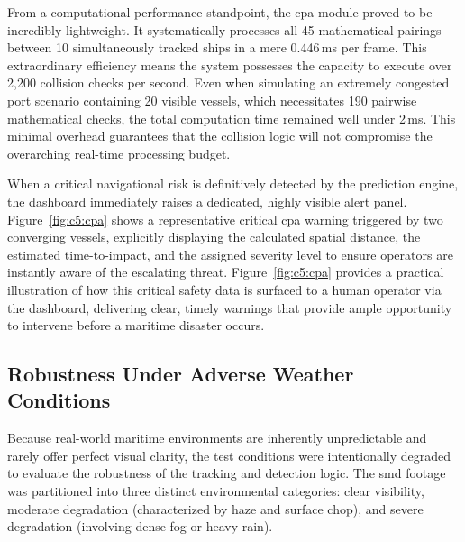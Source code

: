 From a computational performance standpoint, the \gls{cpa} module proved to be incredibly lightweight. It systematically processes all 45 mathematical pairings between 10 simultaneously tracked ships in a mere 0.446\,ms per frame. This extraordinary efficiency means the system possesses the capacity to execute over 2,200 collision checks per second. Even when simulating an extremely congested port scenario containing 20 visible vessels, which necessitates 190 pairwise mathematical checks, the total computation time remained well under 2\,ms. This minimal overhead guarantees that the collision logic will not compromise the overarching real-time processing budget.
\begin{reportfigblock}
When a critical navigational risk is definitively detected by the prediction engine, the dashboard immediately raises a dedicated, highly visible alert panel. Figure~\ref{fig:c5:cpa} shows a representative critical \gls{cpa} warning triggered by two converging vessels, explicitly displaying the calculated spatial distance, the estimated time-to-impact, and the assigned severity level to ensure operators are instantly aware of the escalating threat.
Figure~\ref{fig:c5:cpa} provides a practical illustration of how this critical safety data is surfaced to a human operator via the dashboard, delivering clear, timely warnings that provide ample opportunity to intervene before a maritime disaster occurs.
\end{reportfigblock}

\subsection{Robustness Under Adverse Weather Conditions}

Because real-world maritime environments are inherently unpredictable and rarely offer perfect visual clarity, the test conditions were intentionally degraded to evaluate the robustness of the tracking and detection logic. The \gls{smd} footage was partitioned into three distinct environmental categories: clear visibility, moderate degradation (characterized by haze and surface chop), and severe degradation (involving dense fog or heavy rain).

